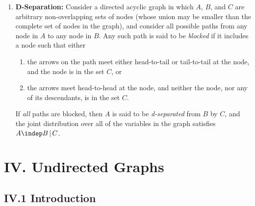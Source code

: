 \documentclass[12pt]{article}
\begin{document}
\begin{enumerate}[label=\textbf{\arabic*.}]
	\item \textbf{D-Separation:} Consider a directed acyclic graph in which $A$, $B$, and $C$ are arbitrary non-overlapping sets of nodes (whose union may be smaller than the complete set of nodes in the graph), and consider all possible paths from any node in $A$ to any node in $B$. Any such path is said to be \emph{blocked} if it includes a node such that either 
	\begin{enumerate}
		\item the arrows on the path meet either head-to-tail or tail-to-tail at the node, and the node is in the set $C$, or
		\item the arrows meet head-to-head at the node, and neither the node, nor any of its descendants, is in the set $C$. 
	\end{enumerate}
	If \emph{all} paths are blocked, then $A$ is said to be \emph{d-separated} from $B$ by $C$, and the joint distribution over all of the variables in the graph satisfies $A \indep B \,\vert\, C$. 

\end{enumerate}


\section*{IV. Undirected Graphs}


\subsection*{IV.1 Introduction}
\end{document}
